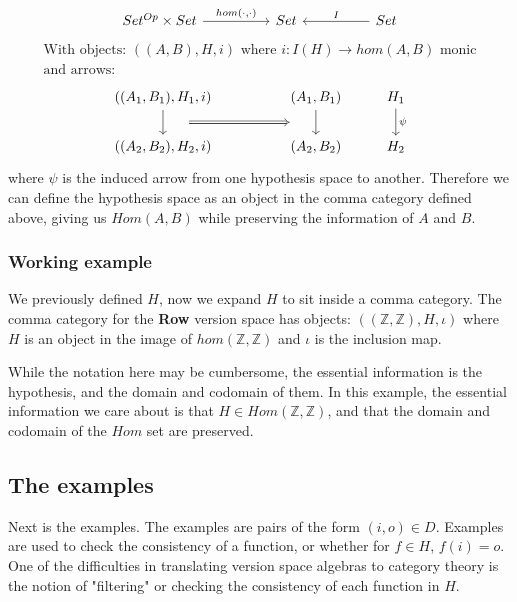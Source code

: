\documentclass{article}
\theoremstyle{definition}
\begin{document}
\[\begin{tikzcd}
	{Set^{Op} \times Set} && Set && Set
	\arrow["{hom(\cdot, \cdot)}", from=1-1, to=1-3]
	\arrow["I"', from=1-5, to=1-3]
\end{tikzcd}\]
\begin{gather*}
    \text{With objects: } ((A,B), H, i) \text{ where $i: I(H) \rightarrow hom(A,B)$ monic} \\
    \text{and arrows: } 
\end{gather*}
\[\begin{tikzcd}
	{((A_1,B_1), H_1, i)} && {(A_1, B_1)} & {H_1} \\
	{((A_2,B_2),H_2, i)} && {(A_2,B_2)} & {H_2}
	\arrow[""{name=0, anchor=center, inner sep=0}, from=1-1, to=2-1]
	\arrow[""{name=1, anchor=center, inner sep=0}, from=1-3, to=2-3]
	\arrow["\psi", from=1-4, to=2-4]
	\arrow[shorten <=18pt, shorten >=18pt, Rightarrow, from=0, to=1]
\end{tikzcd}\]
where $\psi$ is the induced arrow from one hypothesis space to another. Therefore we can define the hypothesis space as an object in the comma category defined above, giving us $Hom(A,B)$ while preserving the information of $A$ and $B$.

\subsubsection{Working example}
We previously defined $H$, now we expand $H$ to sit inside a comma category. The comma category for the \textbf{Row} version space has objects: $((\mathbb{Z}, \mathbb{Z}), H, \iota)$ where $H$ is an object in the image of $hom(\mathbb{Z},\mathbb{Z})$ and $\iota$ is the inclusion map. 

While the notation here may be cumbersome, the essential information is the hypothesis, and the domain and codomain of them.  In this example, the essential information we care about is that $H \in Hom(\mathbb{Z}, \mathbb{Z})$, and that the domain and codomain of the $Hom$ set are preserved.  

\subsection{The examples}
Next is the examples. The examples are pairs of the form $(i,o) \in D$. Examples are used to check the consistency of a function, or whether for $f\in H$, $f(i) = o$. One of the difficulties in translating version space algebras to category theory is the notion of "filtering" or checking the consistency of each function in $H$.  
\end{document}
